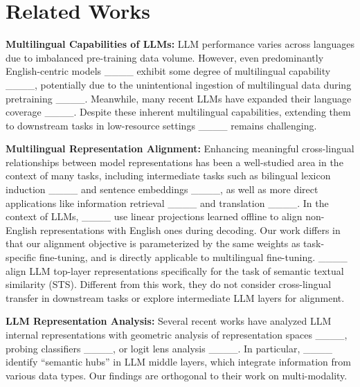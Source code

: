 \section{Related Works}
\textbf{Multilingual Capabilities of LLMs:}
LLM performance varies across languages due to imbalanced pre-training data volume.  
However, even predominantly English-centric models ____ exhibit some degree of multilingual capability ____,
potentially due to the unintentional ingestion of multilingual data during pretraining ____.
Meanwhile, many recent LLMs have expanded their language coverage ____.
Despite these inherent multilingual capabilities, 
extending them to downstream tasks in low-resource settings ____ remains challenging. 

\noindent
\textbf{Multilingual Representation Alignment:}
Enhancing meaningful cross-lingual relationships between model representations has been a well-studied area in the context of many tasks,
including intermediate tasks such as 
bilingual lexicon induction ____ and
sentence embeddings ____,
as well as more direct applications like 
information retrieval ____ and translation ____.
In the context of LLMs, 
____ 
use linear projections learned offline to align non-English representations with English ones during decoding.
Our work differs in that our alignment objective is parameterized by the same weights as task-specific fine-tuning, 
and is directly applicable to multilingual fine-tuning.
____ align LLM top-layer representations specifically for the task of semantic textual similarity (STS).
Different from this work, they do not consider cross-lingual transfer in downstream tasks or explore intermediate LLM layers for alignment.

\noindent
\textbf{LLM Representation Analysis:}
Several recent works have analyzed LLM internal representations with
geometric analysis of representation spaces ____,
probing classifiers ____,
or logit lens analysis ____.
In particular,
____ identify “semantic hubs” in LLM middle layers, which integrate information from various data types.
Our findings are orthogonal to their work on multi-modality.